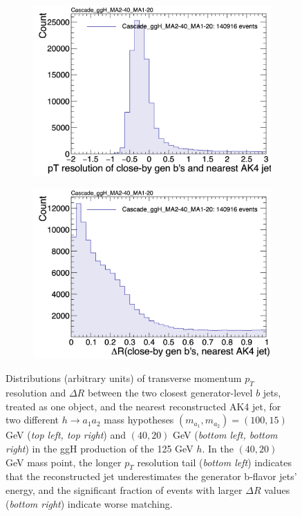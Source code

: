 \begin{figure}[h]
\begin{subfigure}{0.45\textwidth}
        \includegraphics[width=1.0\textwidth]{figures/ch-11-asymmetric/Cascade_ggH_MA2-40_MA1-20_pt_resolution_ak4_leadingPair}
    \end{subfigure}
    \hfill
    \begin{subfigure}{0.45\textwidth}
        \includegraphics[width=1.0\textwidth]{figures/ch-11-asymmetric/Cascade_ggH_MA2-40_MA1-20_deltaR_ak4_leadingPair}
    \end{subfigure}     
    \caption{Distributions (arbitrary units) of transverse momentum $p_{T}$ resolution and $\Delta R$ between the two closest generator-level $b$ jets, treated as one object, and the nearest reconstructed AK4 jet, for two different $h\rightarrow a_1 a_2$ mass hypotheses $(m_{a_1}, m_{a_2}) = (100, 15)$ GeV (\textit{top left, top right}) and $(40, 20)$ GeV (\textit{bottom left, bottom right}) in the ggH production of the 125 GeV $h$. In the $(40, 20)$ GeV mass point, the longer $p_{T}$ resolution tail (\textit{bottom left}) indicates that the reconstructed jet underestimates the generator b-flavor jets' energy, and the significant fraction of events with larger $\Delta R$ values (\textit{bottom right}) indicate worse matching.}
    \label{fig:cascade_matching_to_AK4_jets}
\end{figure}



